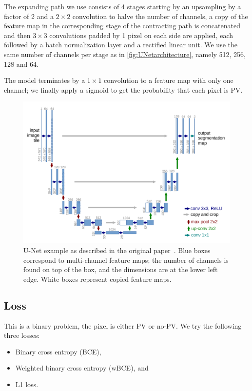 \documentclass[10pt,conference]{IEEEtran}
\begin{document}
The expanding path we use consists of 4 stages starting by an upsampling by a factor of 2 and a $2 \times 2$ convolution to halve the number of channels,
a copy of the feature map in the corresponding stage of the contracting path is concatenated and then $3 \times 3$ convolutions padded by 1 pixel on each side are applied,
each followed by a batch normalization layer and a rectified linear unit.
We use the same number of channels per stage as in \autoref{fig:UNetarchitecture}, namely 512, 256, 128 and 64.

The model terminates by a $1 \times 1$ convolution to a feature map with only one channel; we finally apply a sigmoid to get the probability that each pixel is PV.

\begin{figure}[tbp]
    \centering
    \includegraphics[width=.8\columnwidth]{report/images/UNet.png}
    \caption{
        U-Net example as described in the original paper~\cite{ronneberger2015unet}.
        Blue boxes correspond to multi-channel feature maps; the number of channels is found on top of the box, and the dimensions are at the lower left edge.
        White boxes represent copied feature maps.
    }
    \label{fig:UNetarchitecture}
\end{figure}

\subsection{Loss}\label{loss}
This is a binary problem, the pixel is either PV or no-PV. We try the following three losses:
\begin{itemize}
    \item Binary cross entropy (BCE),
    \item Weighted binary cross entropy (wBCE), and
    \item L1 loss.
\end{itemize}
\end{document}
